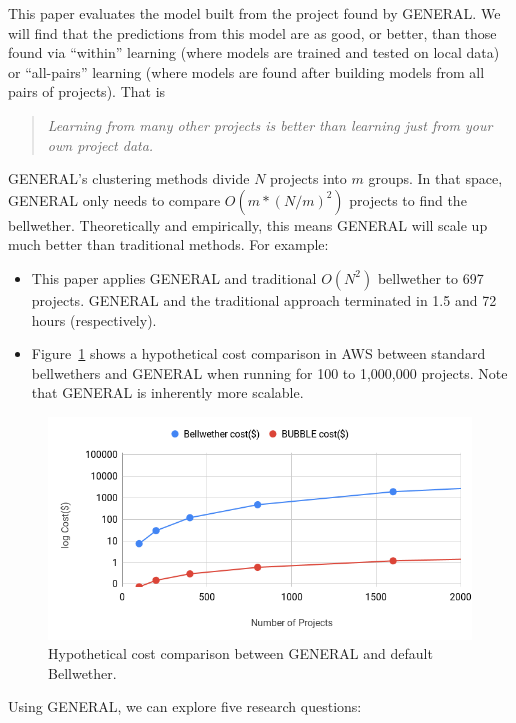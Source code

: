 \documentclass[10pt,journal,compsoc]{IEEEtran}
\newcommand{\bi}{\begin{itemize}}
\newcommand{\ei}{\end{itemize}}
\begin{document}
 This paper evaluates the model built from the project   found by GENERAL. 
 We will find that  the predictions
 from this model  are as good, or better,
 than those found  via ``within'' learning (where models are trained and tested on local data)
 or ``all-pairs'' learning (where models are found after building models from all pairs of projects).
   That is
\begin{quote}
{\em 
Learning from many other projects is better than learning just from your own project data.
}\end{quote}
GENERAL's clustering methods divide $N$ projects into $m$ groups. In that space,   GENERAL only needs
to compare $O(m*(N/m)^2)$  projects to find the bellwether. Theoretically and empirically, 
this means GENERAL will scale up much better than traditional   methods.
For example:
\bi
\item
This paper applies GENERAL and traditional $O(N^2)$ bellwether to 697 projects.
GENERAL and the traditional approach terminated in 1.5 and 72 hours (respectively).

\item 
 Figure~\ref{fig:cost} shows a hypothetical cost comparison in AWS between standard bellwethers and   GENERAL when running for 100 to 1,000,000 projects. Note that GENERAL
 is inherently more scalable.
 \ei
\begin{figure}[!t]
    \centering
    \includegraphics[width=\linewidth]{figs/cost.png}
    \caption{Hypothetical cost comparison between GENERAL and default Bellwether.}
    \label{fig:cost}
\end{figure} 
Using GENERAL, we can  explore five research questions:
\end{document}
